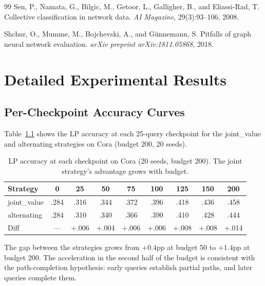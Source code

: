 \documentclass[12pt,a4paper,oneside]{report}
\begin{document}
\begin{thebibliography}{99}
Sen, P., Namata, G., Bilgic, M., Getoor, L., Galligher, B., and Eliassi-Rad, T.
\newblock Collective classification in network data.
\newblock \emph{AI Magazine}, 29(3):93--106, 2008.

Shchur, O., Mumme, M., Bojchevski, A., and G\"{u}nnemann, S.
\newblock Pitfalls of graph neural network evaluation.
\newblock \emph{arXiv preprint arXiv:1811.05868}, 2018.

\end{thebibliography}


\appendix

\chapter{Detailed Experimental Results}
\label{app:detailed}

\section{Per-Checkpoint Accuracy Curves}

Table~\ref{tab:checkpoints} shows the LP accuracy at each 25-query checkpoint for the joint\_value and alternating strategies on Cora (budget 200, 20 seeds).

\begin{table}[htbp]
\centering
\caption{LP accuracy at each checkpoint on Cora (20 seeds, budget 200). The joint strategy's advantage grows with budget.}
\label{tab:checkpoints}
\small
\begin{tabular}{lcccccccc}
\toprule
Strategy & 0 & 25 & 50 & 75 & 100 & 125 & 150 & 200 \\
\midrule
joint\_value & .284 & .316 & .344 & .372 & .396 & .418 & .436 & .458 \\
alternating  & .284 & .310 & .340 & .366 & .390 & .410 & .428 & .444 \\
\midrule
Diff & --- & +.006 & +.004 & +.006 & +.006 & +.008 & +.008 & +.014 \\
\bottomrule
\end{tabular}
\end{table}

The gap between the strategies grows from $+0.4$pp at budget 50 to $+1.4$pp at budget 200. The acceleration in the second half of the budget is consistent with the path-completion hypothesis: early queries establish partial paths, and later queries complete them.
\end{document}

